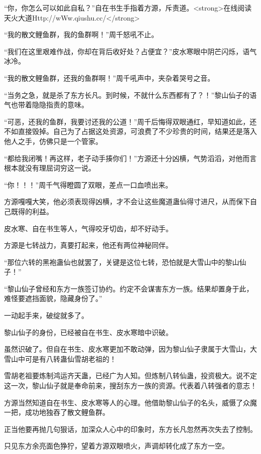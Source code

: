 
\begin{this_body}

“你，你怎么可以如此自私？”自在书生手指着方源，斥责道。<strong>在线阅读天火大道Http://wWw.qiushu.cc/</strong>

“我的散文鲤鱼群，我的鱼群啊！”周千怒吼不止。

“我们在这里艰难作战，你却在背后收好处？占便宜？”皮水寒眼中阴芒闪烁，语气冰冷。

“我的散文鲤鱼群，还我的鱼群啊！”周千吼声中，夹杂着哭号之音。

“当务之急，就是杀了东方长凡。到时候，不就什么东西都有了？！”黎山仙子的语气也带着隐隐指责的意味。

“可恶，还我的鱼群，我要讨还我的公道！”周千后悔得双眼通红，早知道如此，还不如直接毁掉。自己为了占据这处资源，可浪费了不少珍贵的时间，结果还是落入他人之手，仿佛只是一个管家。

“都给我闭嘴！再这样，老子动手揍你们！”方源还十分凶横，气势滔滔，对他而言根本就没有理屈词穷这一说。

“你！！！”周千气得瞪圆了双眼，差点一口血喷出来。

方源嘎嘎大笑，他必须表现得凶横，才不会让这些魔道蛊仙得寸进尺，从而保下自己既得的利益。

皮水寒、自在书生等人，气得咬牙切齿，却不好动手。

方源是七转战力，真要打起来，他还有两位神秘同伴。

“那位六转的黑袍蛊仙也就罢了，关键是这位七转，恐怕就是大雪山中的黎山仙子！”

“黎山仙子曾经和东方一族签订协约。约定不会谋害东方一族。结果却置身于此，难怪要遮挡面貌，隐藏身份了。”

一动起手来，破绽就多了。

黎山仙子的身份，已经被自在书生、皮水寒暗中识破。

虽然识破了。但自在书生、皮水寒更加不敢动弹，因为黎山仙子隶属于大雪山，大雪山中可是有八转蛊仙雪胡老祖的！

雪胡老祖要炼制鸿运齐天蛊，已经广为人知。但炼制八转仙蛊，投资极大。说不定这一次，黎山仙子就是奉命前来，搜刮东方一族的资源。代表着八转强者的意志！

方源当然知道自在书生、皮水寒等人的心理。他借助黎山仙子的名头，威慑了众魔一把，成功地独吞了散文鲤鱼群。

正当他要再抛几句狠话，加深众人心中的印象时，东方长凡忽然再次失去了控制。

只见东方余亮面色狰狞，望着方源双眼喷火，声调却转化成了东方一空。


\end{this_body}
